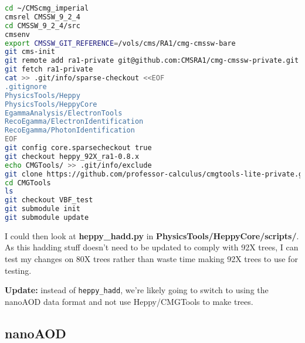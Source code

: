 \begin{lstlisting}[belowskip=-0.7cm, language=sh]
cd ~/CMScmg_imperial
cmsrel CMSSW_9_2_4
cd CMSSW_9_2_4/src
cmsenv
export CMSSW_GIT_REFERENCE=/vols/cms/RA1/cmg-cmssw-bare
git cms-init
git remote add ra1-private git@github.com:CMSRA1/cmg-cmssw-private.git
git fetch ra1-private
cat >> .git/info/sparse-checkout <<EOF
.gitignore
PhysicsTools/Heppy
PhysicsTools/HeppyCore
EgammaAnalysis/ElectronTools
RecoEgamma/ElectronIdentification
RecoEgamma/PhotonIdentification
EOF
git config core.sparsecheckout true
git checkout heppy_92X_ra1-0.8.x
echo CMGTools/ >> .git/info/exclude
git clone https://github.com/professor-calculus/cmgtools-lite-private.git CMGTools
cd CMGTools
ls
git checkout VBF_test
git submodule init
git submodule update
\end{lstlisting}

I could then look at \textbf{heppy\_hadd.py} in \textbf{PhysicsTools/HeppyCore/scripts/}. As this hadding stuff doesn't need to be updated to comply with 92X trees, I can test my changes on 80X trees rather than waste time making 92X trees to use for testing.

\textbf{Update:} instead of \texttt{heppy\_hadd}, we're likely going to switch to using the nanoAOD data format and not use Heppy/CMGTools to make trees.


\subsection{nanoAOD}
